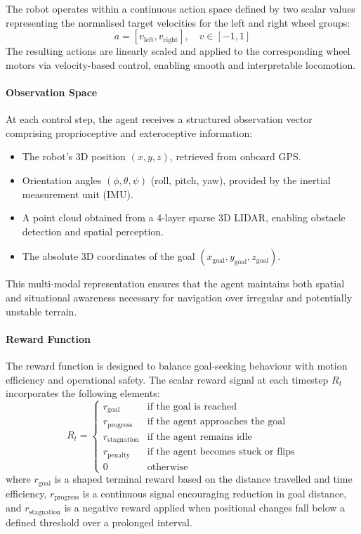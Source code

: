 \documentclass[conference]{IEEEtran}
\begin{document}
The robot operates within a continuous action space defined by two scalar values representing the normalised target velocities for the left and right wheel groups:
\[
a = [v_{\text{left}}, v_{\text{right}}], \quad v \in [-1, 1]
\]
The resulting actions are linearly scaled and applied to the corresponding wheel motors via velocity-based control, enabling smooth and interpretable locomotion.

\paragraph{Observation Space}

At each control step, the agent receives a structured observation vector comprising proprioceptive and exteroceptive information:
\begin{itemize}
    \item The robot's 3D position $(x, y, z)$, retrieved from onboard GPS.
    \item Orientation angles $(\phi, \theta, \psi)$ (roll, pitch, yaw), provided by the inertial measurement unit (IMU).
    \item A point cloud obtained from a 4-layer sparse 3D LIDAR, enabling obstacle detection and spatial perception.
    \item The absolute 3D coordinates of the goal $(x_{\text{goal}}, y_{\text{goal}}, z_{\text{goal}})$.
\end{itemize}

This multi-modal representation ensures that the agent maintains both spatial and situational awareness necessary for navigation over irregular and potentially unstable terrain.

\paragraph{Reward Function}

The reward function is designed to balance goal-seeking behaviour with motion efficiency and operational safety. The scalar reward signal at each timestep \( R_t \) incorporates the following elements:
\[
R_t =
\begin{cases}
r_{\text{goal}} & \text{if the goal is reached} \\
r_{\text{progress}} & \text{if the agent approaches the goal} \\
r_{\text{stagnation}} & \text{if the agent remains idle} \\
r_{\text{penalty}} & \text{if the agent becomes stuck or flips} \\
0 & \text{otherwise}
\end{cases}
\]
where \( r_{\text{goal}} \) is a shaped terminal reward based on the distance travelled and time efficiency, \( r_{\text{progress}} \) is a continuous signal encouraging reduction in goal distance, and \( r_{\text{stagnation}} \) is a negative reward applied when positional changes fall below a defined threshold over a prolonged interval.
\end{document}
